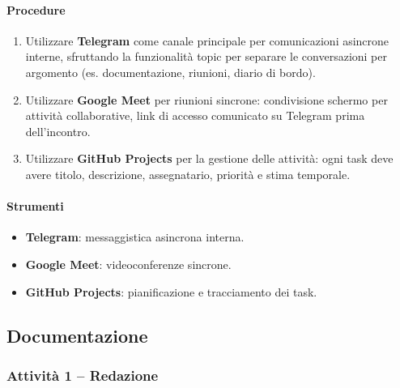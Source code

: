 \documentclass[a4paper, 11pt, oneside]{scrartcl}
\begin{document}
\paragraph{Procedure}
\begin{enumerate}
    \item Utilizzare \textbf{Telegram} come canale principale per comunicazioni asincrone interne, sfruttando la funzionalità topic{\scriptsize{}} per separare le conversazioni per argomento (es. documentazione, riunioni, diario di bordo).
    \item Utilizzare \textbf{Google Meet} per riunioni sincrone: condivisione schermo per attività collaborative, link di accesso comunicato su Telegram prima dell'incontro.
    \item Utilizzare \textbf{GitHub Projects} per la gestione delle attività: ogni task deve avere titolo, descrizione, assegnatario, priorità e stima temporale.
\end{enumerate}

\paragraph{Strumenti}
\begin{itemize}
    \item \textbf{Telegram}: messaggistica asincrona interna.
    \item \textbf{Google Meet}: videoconferenze sincrone.
    \item \textbf{GitHub Projects}: pianificazione e tracciamento dei task.
\end{itemize}

\subsection{Documentazione}
\label{sec:documentazione}

\subsubsection{Attività 1 – Redazione}
\end{document}
